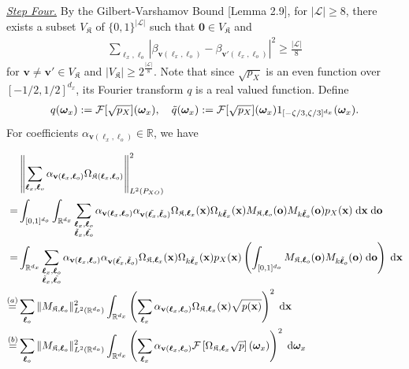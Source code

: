 \documentclass[11pt]{article}
\newcommand{\bx}{\mathbf x}
\newcommand{\bv}{\mathbf v}
\newcommand{\bo}{\mathbf o}
\newcommand{\bomega}{\boldsymbol{\omega}}
\newcommand{\calF}{\mathcal{F}}
\newcommand{\calL}{\mathcal{L}}
\newcommand{\bl}{{\boldsymbol\ell}}
\newcommand{\0}{\mathbf{0}}
\begin{document}
\begin{appendix}
\vspace{3mm}
\noindent
\underline{\emph{Step Four.}}
By the Gilbert-Varshamov Bound \cite{Tsybakov}[Lemma 2.9], for $|\calL|\geq 8$, there exists a subset $V_\mathfrak{K}$ of $\{0,1\}^{|\calL|}$ such that $\boldsymbol{0}\in V_\mathfrak{K}$ and
\begin{align}
\label{eq: gv_beta_sep}
    \sum_{\bl_x,\bl_o}\left|\beta_{\bv (\bl_x,\bl_o)} - \beta_{\bv' (\bl_x,\bl_o)}\right|^2 \geq \frac{|\calL|}{8}
\end{align}
for $\bv\neq \bv'\in V_\mathfrak{K}$ and $|V_\mathfrak{K}|\geq 2^{\frac{|\calL|}{8}}$. 
Note that since $\sqrt{p_X}$ is an even function over $[-1/2,1/2]^{d_x}$, its Fourier transform $q$ is a real valued function. Define
\begin{align}\label{eq:defi_tilde_q}
    q(\bomega_x) := \calF[\sqrt{p_{X}}](\bomega_x) , \quad
    \Tilde{q}(\bomega_x) := \calF[\sqrt{p_X}](\bomega_x) 1_{[-\zeta/3, \zeta/3]^{d_x}}(\bomega_x).
\end{align}
For coefficients $\alpha_{\bv(\bl_x,\bl_o)} \in \mathbb{R}$, we have
\begin{small}
\begin{align}
    &\left\|\sum_{\bl_x,\bl_o} \alpha_{\bv(\bl_x,\bl_o)}\Omega_{\mathfrak{K}(\bl_x,\bl_o)}\right\|^2_{L^2(P_{XO})}\nonumber\\
    =& \int_{[0,1]^{d_o}}\int_{\mathbb{R}^{d_x}}\sum_{\substack{\bl_x,\bl_o\nonumber\\ \Tilde{\bl}_x, \Tilde{\bl_o}}} \alpha_{\bv(\bl_x,\bl_o)}\alpha_{\bv(\Tilde{\bl_x}, \Tilde{\bl}_o)} \Omega_{\mathfrak{K},\bl_x}(\bx)\Omega_{k\Tilde{\bl}_x}(\bx)M_{\mathfrak{K},\bl_o}(\bo)M_{k\Tilde{\bl}_o}(\bo)p_X(\bx)\;\mathrm{d}\bx\;\mathrm{d}\bo\nonumber\\
    = & \int_{\mathbb{R}^{d_x}}\sum_{\substack{\bl_x,\bl_o\\ \Tilde{\bl}_x, \Tilde{\bl_o}}} \alpha_{\bv(\bl_x,\bl_o)}\alpha_{\bv(\Tilde{\bl_x}, \Tilde{\bl}_o)} \Omega_{\mathfrak{K},\bl_x}(\bx)\Omega_{k\Tilde{\bl}_x}(\bx) p_X(\bx)\left(\int_{[0,1]^{d_o}}M_{\mathfrak{K},\bl_o}(\bo)M_{k\Tilde{\bl}_o}(\bo)\;\mathrm{d}\bo\right)\;\mathrm{d}\bx\nonumber\\
    \stackrel{(a)}{=} & \sum_{\bl_o}\|M_{\mathfrak{K},\bl_o}\|^2_{L^2(\mathbb{R}^{d_o})}\int_{\mathbb{R}^{d_x}} \left(\sum_{\bl_x}\alpha_{\bv(\bl_x,\bl_o)}\Omega_{\mathfrak{K},\bl_x}(\bx)\sqrt{p(\bx)}\right)^2\;\mathrm{d}\bx\nonumber\\
    \stackrel{(b)}{=} & \sum_{\bl_o}\|M_{\mathfrak{K},\bl_o}\|^2_{L^2(\mathbb{R}^{d_o})}\int_{\mathbb{R}^{d_x}} \left(\sum_{\bl_x}\alpha_{\bv(\bl_x,\bl_o)}\calF\left[\Omega_{\mathfrak{K},\bl_x}\sqrt{p}\right](\bomega_x)\right)^2\;\mathrm{d}\bomega_x\nonumber\\

\end{align}
\end{small}
\end{appendix}
\end{document}
